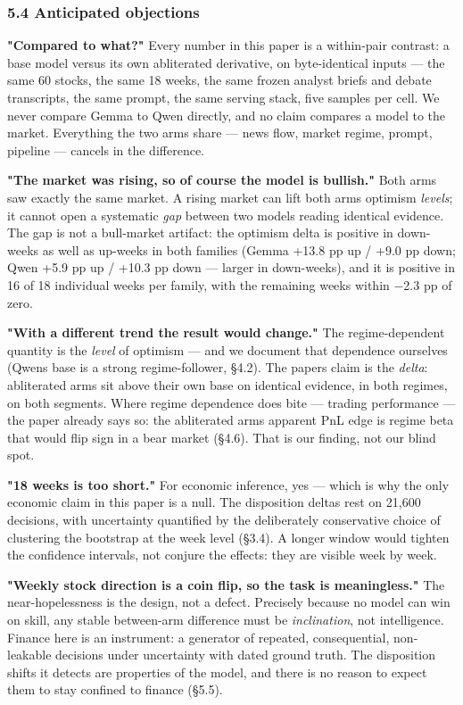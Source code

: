 \documentclass[
  10pt,
]{article}
\begin{document}
\subsubsection{5.4 Anticipated
objections}\label{54-anticipated-objections}

\textbf{"Compared to what?"} Every number in this paper is a within-pair
contrast: a base model versus its own abliterated derivative, on
byte-identical inputs --- the same 60 stocks, the same 18 weeks, the
same frozen analyst briefs and debate transcripts, the same prompt, the
same serving stack, five samples per cell. We never compare Gemma to
Qwen directly, and no claim compares a model to the market. Everything
the two arms share --- news flow, market regime, prompt, pipeline ---
cancels in the difference.

\textbf{"The market was rising, so of course the model is bullish."}
Both arms saw exactly the same market. A rising market can lift both
arms\textquotesingle{} optimism \emph{levels}; it cannot open a
systematic \emph{gap} between two models reading identical evidence. The
gap is not a bull-market artifact: the optimism delta is positive in
down-weeks as well as up-weeks in both families (Gemma +13.8 pp up /
+9.0 pp down; Qwen +5.9 pp up / +10.3 pp down --- larger in down-weeks),
and it is positive in 16 of 18 individual weeks per family, with the
remaining weeks within −2.3 pp of zero.

\textbf{"With a different trend the result would change."} The
regime-dependent quantity is the \emph{level} of optimism --- and we
document that dependence ourselves (Qwen\textquotesingle s base is a
strong regime-follower, §4.2). The paper\textquotesingle s claim is the
\emph{delta}: abliterated arms sit above their own base on identical
evidence, in both regimes, on both segments. Where regime dependence
does bite --- trading performance --- the paper already says so: the
abliterated arms\textquotesingle{} apparent PnL edge is regime beta that
would flip sign in a bear market (§4.6). That is our finding, not our
blind spot.

\textbf{"18 weeks is too short."} For economic inference, yes --- which
is why the only economic claim in this paper is a null. The disposition
deltas rest on 21,600 decisions, with uncertainty quantified by the
deliberately conservative choice of clustering the bootstrap at the week
level (§3.4). A longer window would tighten the confidence intervals,
not conjure the effects: they are visible week by week.

\textbf{"Weekly stock direction is a coin flip, so the task is
meaningless."} The near-hopelessness is the design, not a defect.
Precisely because no model can win on skill, any stable between-arm
difference must be \emph{inclination}, not intelligence. Finance here is
an instrument: a generator of repeated, consequential, non-leakable
decisions under uncertainty with dated ground truth. The disposition
shifts it detects are properties of the model, and there is no reason to
expect them to stay confined to finance (§5.5).
\end{document}
